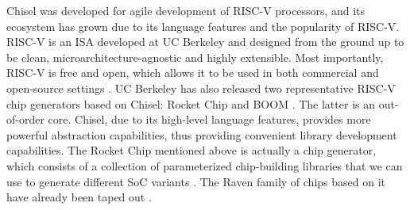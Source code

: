 \documentclass[conference]{IEEEtran}
\theoremstyle{definition}
\begin{document}
Chisel was developed for agile development of RISC-V processors, and its ecosystem has grown due to its language features and the popularity of RISC-V.
RISC-V is an ISA developed at UC Berkeley and designed from the ground up to be clean, microarchitecture-agnostic and highly extensible. Most importantly, RISC-V is free and open, which allows it to be used in both commercial and open-source settings \cite{asanovic2014instruction}.
UC Berkeley has also released two representative RISC-V chip generators based on Chisel: Rocket Chip \cite{asanovic2016rocket} and BOOM \cite{celio2017boomv2}.
The latter is an out-of-order core.
Chisel, due to its high-level language features, provides more powerful abstraction capabilities, thus providing convenient library development capabilities. 
The Rocket Chip mentioned above is actually a chip generator, which consists of a collection of parameterized chip-building libraries that we can use to generate different SoC variants \cite{asanovic2016rocket}.
The Raven family of chips based on it have already been taped out \cite{lee2015raven}.
\end{document}

